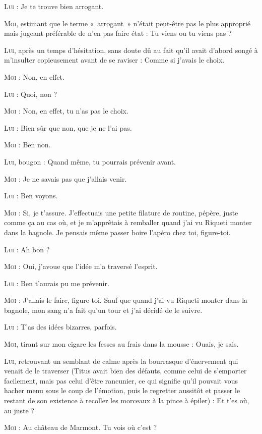 \begin{dialogue}
\textsc{Lui} : Je te trouve bien arrogant.

\textsc{Moi}, estimant que le terme «~arrogant~» n’était peut-être pas le plus approprié mais jugeant préférable de n’en pas faire état : Tu viens ou tu viens pas ?

\textsc{Lui}, après un temps d’hésitation, sans doute dû au fait qu’il avait d’abord songé à m’insulter copieusement avant de se raviser : Comme si j’avais le choix.

\textsc{Moi} : Non, en effet.

\textsc{Lui} : Quoi, non ?

\textsc{Moi} : Non, en effet, tu n’as pas le choix.

\textsc{Lui} : Bien sûr que non, que je ne l’ai pas.

\textsc{Moi} : Ben non.

\textsc{Lui}, bougon : Quand même, tu pourrais prévenir avant.

\textsc{Moi} : Je ne savais pas que j’allais venir.

\textsc{Lui} : Ben voyons.

\textsc{Moi} : Si, je t’assure. J’effectuais une petite filature de routine, pépère, juste comme ça au cas où, et je m’apprêtais à remballer quand j’ai vu Riqueti monter dans la bagnole. Je pensais même passer boire l’apéro chez toi, figure-toi.

\textsc{Lui} : Ah bon ?

\textsc{Moi} : Oui, j’avoue que l’idée m’a traversé l’esprit.

\textsc{Lui} : Ben t’aurais pu me prévenir.

\textsc{Moi} : J’allais le faire, figure-toi. Sauf que quand j’ai vu Riqueti monter dans la bagnole, mon sang n’a fait qu’un tour et j’ai décidé de le suivre.

\textsc{Lui} : T’as des idées bizarres, parfois.

\textsc{Moi}, tirant sur mon cigare les fesses au frais dans la mousse : Ouais, je sais.

\textsc{Lui}, retrouvant un semblant de calme après la bourrasque d’énervement qui venait de le traverser (Titus avait bien des défauts, comme celui de s’emporter facilement, mais pas celui d’être rancunier, ce qui signifie qu’il pouvait vous hacher menu sous le coup de l’émotion, puis le regretter aussitôt et passer le restant de son existence à recoller les morceaux à la pince à épiler) : Et t’es où, au juste ?

\textsc{Moi} : Au château de Marmont. Tu vois où c’est ?


\end{dialogue}
